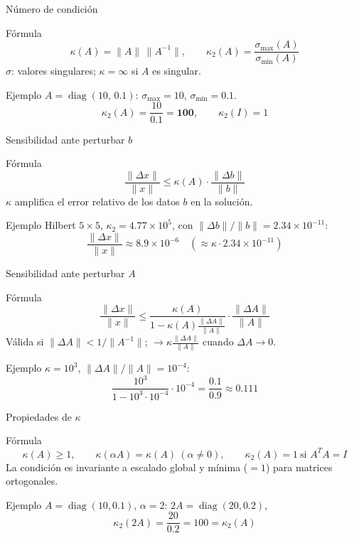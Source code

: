 \documentclass[aspectratio=169,10pt]{beamer}
\begin{document}
\begin{frame}{Número de condición}
\begin{cardidea}{Fórmula}{\faSuperscript}
\[ \kappa(A)=\|A\|\,\|A^{-1}\|,\qquad \kappa_2(A)=\frac{\sigma_{\max}(A)}{\sigma_{\min}(A)} \]
$\sigma$: valores singulares; $\kappa=\infty$ si $A$ es singular.
\end{cardidea}
\vspace{1.5mm}
\begin{cardgear}{Ejemplo}{\faCalculator}
$A=\operatorname{diag}(10,\,0.1)$: $\sigma_{\max}=10$, $\sigma_{\min}=0.1$.
\[ \kappa_2(A)=\frac{10}{0.1}=\mathbf{100},\qquad \kappa_2(I)=1 \]
\end{cardgear}
\end{frame}

\begin{frame}{Sensibilidad ante perturbar $b$}
\begin{cardidea}{Fórmula}{\faSuperscript}
\[ \frac{\|\Delta x\|}{\|x\|}\le \kappa(A)\cdot\frac{\|\Delta b\|}{\|b\|} \]
$\kappa$ amplifica el error relativo de los datos $b$ en la solución.
\end{cardidea}
\vspace{1.5mm}
\begin{cardgear}{Ejemplo}{\faCalculator}
Hilbert $5\times5$, $\kappa_2=4.77\times10^{5}$, con $\|\Delta b\|/\|b\|=2.34\times10^{-11}$:
\[ \frac{\|\Delta x\|}{\|x\|}\approx 8.9\times10^{-6}\quad (\approx\kappa\cdot 2.34\times10^{-11}) \]
\end{cardgear}
\end{frame}

\begin{frame}{Sensibilidad ante perturbar $A$}
\begin{cardidea}{Fórmula}{\faSuperscript}
\[ \frac{\|\Delta x\|}{\|x\|}\le \frac{\kappa(A)}{1-\kappa(A)\frac{\|\Delta A\|}{\|A\|}}\cdot\frac{\|\Delta A\|}{\|A\|} \]
Válida si $\|\Delta A\|<1/\|A^{-1}\|$; $\to\kappa\frac{\|\Delta A\|}{\|A\|}$ cuando $\Delta A\to0$.
\end{cardidea}
\vspace{1.5mm}
\begin{cardgear}{Ejemplo}{\faCalculator}
$\kappa=10^{3}$, $\|\Delta A\|/\|A\|=10^{-4}$:
\[ \frac{10^{3}}{1-10^{3}\cdot10^{-4}}\cdot10^{-4}=\frac{0.1}{0.9}\approx \mathbf{0.111} \]
\end{cardgear}
\end{frame}

\begin{frame}{Propiedades de $\kappa$}
\begin{cardidea}{Fórmula}{\faSuperscript}
\[ \kappa(A)\ge 1,\qquad \kappa(\alpha A)=\kappa(A)\ (\alpha\neq0),\qquad \kappa_2(A)=1\ \text{si } A^TA=I \]
La condición es invariante a escalado global y mínima ($=1$) para matrices ortogonales.
\end{cardidea}
\vspace{1.5mm}
\begin{cardgear}{Ejemplo}{\faCalculator}
$A=\operatorname{diag}(10,0.1)$, $\alpha=2$: $2A=\operatorname{diag}(20,0.2)$,
\[ \kappa_2(2A)=\frac{20}{0.2}=100=\kappa_2(A) \]
\end{cardgear}
\end{frame}
\end{document}
